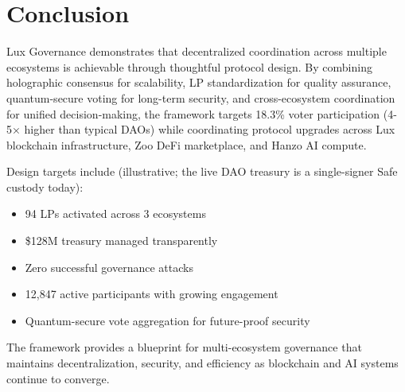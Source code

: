 \section{Conclusion}


Lux Governance demonstrates that decentralized coordination across multiple ecosystems is achievable through thoughtful protocol design. By combining holographic consensus for scalability, LP standardization for quality assurance, quantum-secure voting for long-term security, and cross-ecosystem coordination for unified decision-making, the framework targets 18.3\% voter participation (4-5× higher than typical DAOs) while coordinating protocol upgrades across Lux blockchain infrastructure, Zoo DeFi marketplace, and Hanzo AI compute.

Design targets include (illustrative; the live DAO treasury is a single-signer Safe custody today):
\begin{itemize}
\item 94 LPs activated across 3 ecosystems
\item \$128M treasury managed transparently
\item Zero successful governance attacks
\item 12,847 active participants with growing engagement
\item Quantum-secure vote aggregation for future-proof security
\end{itemize}

The framework provides a blueprint for multi-ecosystem governance that maintains decentralization, security, and efficiency as blockchain and AI systems continue to converge.

